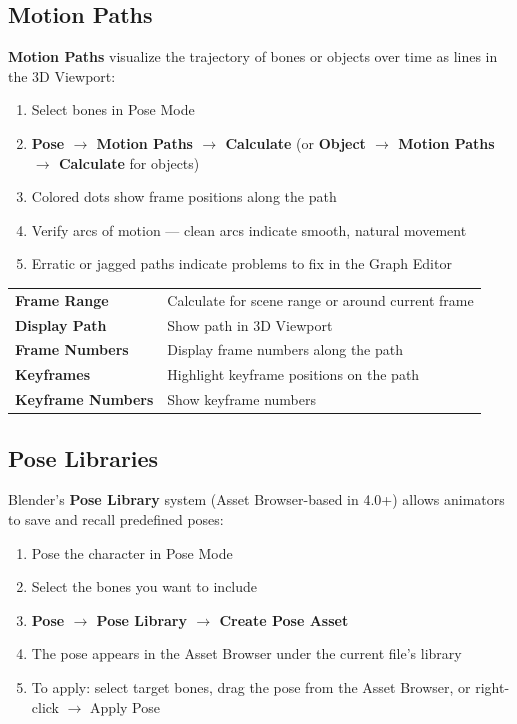 \subsection{Motion Paths}

\textbf{Motion Paths} visualize the trajectory of bones or objects over time as lines in the 3D Viewport:

\begin{enumerate}[leftmargin=2em]
  \item Select bones in Pose Mode
  \item \textbf{Pose $\rightarrow$ Motion Paths $\rightarrow$ Calculate} (or \textbf{Object $\rightarrow$ Motion Paths $\rightarrow$ Calculate} for objects)
  \item Colored dots show frame positions along the path
  \item Verify arcs of motion --- clean arcs indicate smooth, natural movement
  \item Erratic or jagged paths indicate problems to fix in the Graph Editor
\end{enumerate}

\begin{center}
\begin{tabularx}{\textwidth}{L{3cm}X}
\toprule
{}
 &  \\
\midrule
\textbf{Frame Range} & Calculate for scene range or around current frame \\
\textbf{Display Path} & Show path in 3D Viewport \\
\textbf{Frame Numbers} & Display frame numbers along the path \\
\textbf{Keyframes} & Highlight keyframe positions on the path \\
\textbf{Keyframe Numbers} & Show keyframe numbers \\
\bottomrule
\end{tabularx}
\end{center}

\subsection{Pose Libraries}

Blender's \textbf{Pose Library} system (Asset Browser-based in 4.0+) allows animators to save and recall predefined poses:

\begin{enumerate}[leftmargin=2em]
  \item Pose the character in Pose Mode
  \item Select the bones you want to include
  \item \textbf{Pose $\rightarrow$ Pose Library $\rightarrow$ Create Pose Asset}
  \item The pose appears in the Asset Browser under the current file's library
  \item To apply: select target bones, drag the pose from the Asset Browser, or right-click $\rightarrow$ Apply Pose
\end{enumerate}

